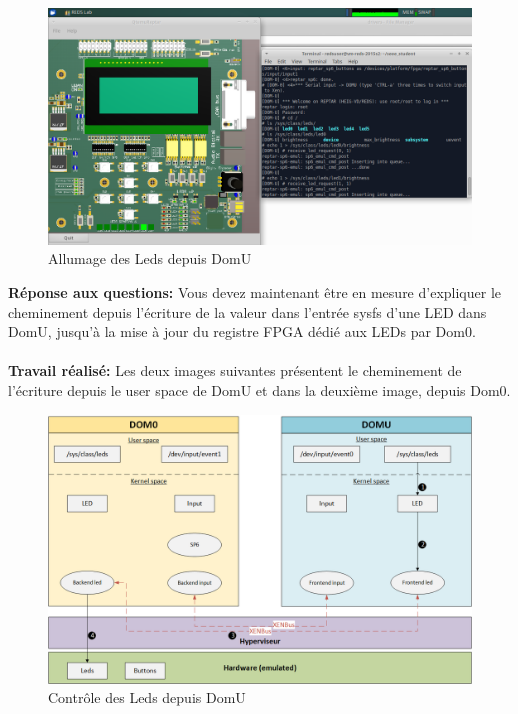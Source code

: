 \begin{figure}[H]
	\begin{center}
		\includegraphics[width=17cm]{img/dom04.png}
		\caption{Allumage des Leds depuis DomU}
		\label{dom04}
	\end{center}
\end{figure}
\textbf{Réponse aux questions: }Vous devez maintenant être en mesure d'expliquer le cheminement depuis l’écriture de la valeur
dans l’entrée sysfs d’une LED dans DomU, jusqu’à la mise à jour du registre FPGA dédié aux LEDs
par Dom0.\\\\
\textbf{Travail réalisé: } Les deux images suivantes présentent le cheminement de l'écriture depuis le user space de DomU et dans la deuxième image, depuis Dom0.
\begin{figure}[H]
	\begin{center}
		\includegraphics[width=17cm]{img/virt3.png}
		\caption{Contrôle des Leds depuis DomU}
		\label{virt3}
	\end{center}
\end{figure}

